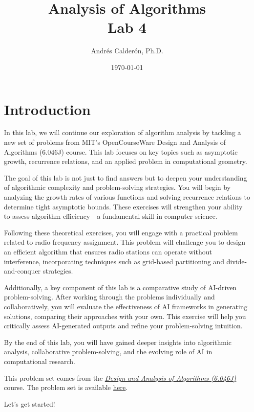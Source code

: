 \documentclass[11pt]{article}
\title{Analysis of Algorithms \\ Lab 4}
\author{Andrés Calderón, Ph.D.}
\date{\today}
\begin{document}
\maketitle

\section{Introduction}
In this lab, we will continue our exploration of algorithm analysis by tackling a new set of problems from MIT's OpenCourseWare Design and Analysis of Algorithms (6.046J) course. This lab focuses on key topics such as asymptotic growth, recurrence relations, and an applied problem in computational geometry.

The goal of this lab is not just to find answers but to deepen your understanding of algorithmic complexity and problem-solving strategies. You will begin by analyzing the growth rates of various functions and solving recurrence relations to determine tight asymptotic bounds. These exercises will strengthen your ability to assess algorithm efficiency—a fundamental skill in computer science.

Following these theoretical exercises, you will engage with a practical problem related to radio frequency assignment. This problem will challenge you to design an efficient algorithm that ensures radio stations can operate without interference, incorporating techniques such as grid-based partitioning and divide-and-conquer strategies.

Additionally, a key component of this lab is a comparative study of AI-driven problem-solving. After working through the problems individually and collaboratively, you will evaluate the effectiveness of AI frameworks in generating solutions, comparing their approaches with your own. This exercise will help you critically assess AI-generated outputs and refine your problem-solving intuition.

By the end of this lab, you will have gained deeper insights into algorithmic analysis, collaborative problem-solving, and the evolving role of AI in computational research.

This problem set comes from the \href{https://ocw.mit.edu/courses/6-046j-design-and-analysis-of-algorithms-spring-2015/}{\textit{Design and Analysis of Algorithms (6.046J)}} course. The problem set is available \href{https://ocw.mit.edu/courses/6-046j-design-and-analysis-of-algorithms-spring-2015/resources/mit6_046js15_pset1/}{here}.

Let's get started!
\end{document}
